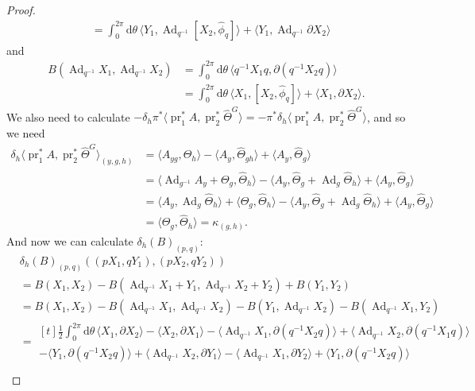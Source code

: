 \documentclass[12pt]{amsart}
\DeclareMathOperator{\Ad}{Ad}
\DeclareMathOperator{\pr}{pr}
\theoremstyle{plain}
\theoremstyle{definition}
\theoremstyle{remark}
\numberwithin{equation}{section}
\newcommand{\<}{\langle}
\renewcommand{\>}{\rangle}
\newcommand{\intSone}{\int_{0}^{2\pi}\mathrm{d}\theta\,}
\newcommand{\Thetahat}{\widehat{\Theta}}
\newcommand{\phihat}{\widehat{\phi}}
\begin{document}
\begin{proof}
\begin{align*}
  &= \intSone \langle Y_1 ,\Ad_{q^{-1}}[X_2,\phihat_q]\rangle + \langle Y_1 ,\Ad_{q^{-1}}\partial X_2\rangle
\end{align*}
and 
\begin{align*}
B(\Ad_{q^{-1}}X_1,\Ad_{q^{-1}}X_2) 
& = \intSone \langle q^{-1}X_1q,\partial(q^{-1}X_2 q)\rangle\\
& = \intSone \langle X_1,[X_2,\phihat_q]\rangle + \langle X_1,\partial X_2\rangle.
\end{align*}
We also need to calculate $-\delta_h \pi^*\langle\pr_1^*A, \pr_2^* \Thetahat^G\rangle = -\pi^* \delta_h\langle\pr_1^*A, \pr_2^* \Thetahat^G\rangle$, and so we need
\begin{align*}
  \delta_h\langle\pr_1^*A, \pr_2^* \Thetahat^G\rangle_{(y,g,h)}&=\langle A_{yg},\Thetahat_h\rangle - \langle A_y,\Thetahat_{gh}\rangle 
  + \langle A_y,\Thetahat_g\rangle\\
  &=\langle \Ad_{g^{-1}}A_y + \Theta_g,\Thetahat_h \rangle
  - \langle A_y,\Thetahat_g+\Ad_g\Thetahat_{h}\rangle 
  + \langle A_y,\Thetahat_g\rangle\\
  &= \langle A_y,\Ad_g\Thetahat_h\rangle + \langle\Theta_g,\Thetahat_h \rangle
  - \langle A_y,\Thetahat_g+\Ad_g\Thetahat_{h}\rangle 
  + \langle A_y,\Thetahat_g\rangle\\
  & = \langle\Theta_g,\Thetahat_h \rangle = \kappa_{(g,h)}.
\end{align*}
And now we can calculate $\delta_h(B)_{(p,q)}$:
\begin{align*}
&\delta_h(B)_{(p,q)}\left((pX_1,qY_1),(pX_2,qY_2)\right) \\
& = B(X_1,X_2) - B(\Ad_{q^{-1}}X_1+Y_1,\Ad_{q^{-1}}X_2+Y_2) + B(Y_1,Y_2)\\
 & = B(X_1,X_2)- B(\Ad_{q^{-1}}X_1,\Ad_{q^{-1}}X_2)
- B( Y_1,\Ad_{q^{-1}}X_2)
- B(\Ad_{q^{-1}}X_1, Y_2)
\\
& = \begin{multlined}[t]
\frac12 \intSone \langle X_1,\partial X_2\rangle - \langle X_2,\partial X_1\rangle  
-\langle\Ad_{q^{-1}}X_1,\partial(q^{-1}X_2q)\rangle
+\langle\Ad_{q^{-1}}X_2,\partial(q^{-1}X_1q)\rangle\\
- \langle Y_1, \partial(q^{-1}X_2q)\rangle + 
\langle \Ad_{q^{-1}}X_2 , \partial Y_1\rangle 
-\langle \Ad_{q^{-1}}X_1 , \partial Y_2\rangle
+ \langle Y_1, \partial(q^{-1}X_2q)\rangle 
\end{multlined}\\

\end{align*}
\end{proof}
\end{document}
